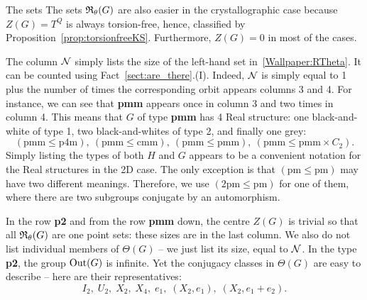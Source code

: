 The sets  The sets ${\mathfrak R}_{\theta}(G)$ are also easier in the crystallographic case because $Z(G)=T^Q$ is always torsion-free,
hence, classified by Proposition~\ref{prop:torsionfreeKS}.
Furthermore, $Z(G)=0$ in most  of the cases.

The column ${{\mathcal N}}$ simply lists the size of the left-hand set in~\eqref{Wallpaper:RTheta}.
It can be counted using Fact~\ref{sect:are_there}.(I).
Indeed, ${{\mathcal N}}$ is simply equal to 1 plus the number of times the corresponding orbit
appears columns 3 and 4.
For instance, we can see that {\bfseries pmm}
appears once in column 3 and two times in column 4. This means that $G$ of type {\bfseries pmm} has 4 Real structure:
one black-and-white of type 1,
two black-and-whites of type 2,
and finally one grey:
\[
(\mathrm{pmm} \leq \mathrm{p4m}), \ 
(\mathrm{pmm} \leq \mathrm{cmm}), \ 
(\mathrm{pmm} \leq \mathrm{pmm}), \
(\mathrm{pmm} \leq \mathrm{pmm}\times C_2).
\]
Simply listing the types of both $H$ and $G$ appears to be a convenient notation for the Real structures in the 2D case.
The only exception is that $(\mathrm{pm} \leq \mathrm{pm})$ may have two different meanings.
Therefore, we use  $(2\mathrm{pm} \leq \mathrm{pm})$ for one of them, where there are two subgroups conjugate by an automorphism.


In the row {\bfseries p2} and from the row {\bfseries pmm} down, 
the centre $Z(G)$ is trivial so that
all ${\mathfrak R}_{\theta}(G)$ are one point sets: these sizes are in the last column.
We also do not list individual members of $\Theta (G)$ -- we just list its size, equal to  ${{\mathcal N}}$.
%
%
In the type  {\bfseries p2}, the group $\operatorname{Out} (G)$ is infinite. Yet the conjugacy classes in $\Theta (G)$ are easy to describe -- 
here are their representatives:
\[ I_2, \; U_2, \; X_2, \; X_4, \; e_1, \; (X_2,e_1), \; (X_2,e_1+e_2). \]


